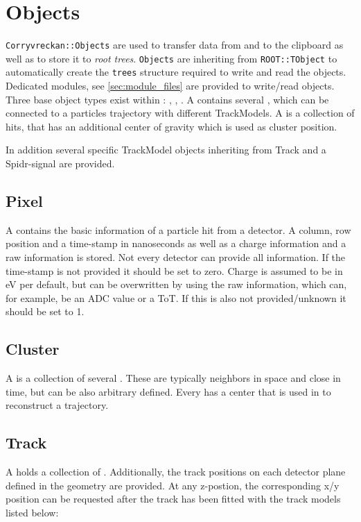 \section{Objects}
\label{sec:objects}
\texttt{Corryvreckan::Objects} are used to transfer data from and to the clipboard as well as to store it to \textit{root trees}. 
\texttt{Objects} are inheriting from \texttt{ROOT::TObject} to automatically create the \texttt{trees} structure required to write and read the objects. 
Dedicated modules, see \ref{sec:module_files} are provided to write/read objects.
Three base object types exist within \corry : \pixel, \cluster, \track.
A \track contains several \cluster, which can be connected to a particles
trajectory with different TrackModels.
A \cluster is a collection of hits, that has an additional center of gravity
which is used as cluster position.

In addition several specific TrackModel objects inheriting from Track and a Spidr-signal are provided. 

\subsection*{Pixel}
A \pixel contains the basic information of a particle hit from a detector. A column, row position and a time-stamp in nanoseconds as well as a charge information and a raw information is stored. Not every detector can provide all information. If the time-stamp is not provided it should be set to zero. Charge is assumed to be in eV per default, but can be overwritten by using the raw information, which can, for example, be an ADC value or a ToT. If this is also not provided/unknown it should be set to 1. 

\subsection*{Cluster}
A \cluster is a collection of several \pixel. These \pixel are typically
neighbors in space and close in time, but can be also arbitrary
defined. Every \cluster has a center that is used in \track to reconstruct a trajectory.  

\subsection{Track}
A \track holds a collection of \cluster. Additionally, the track positions on
each detector plane defined in the geometry are provided. At any z-postion, the
corresponding x/y position can be requested after the track has been fitted
with the track models listed below:

